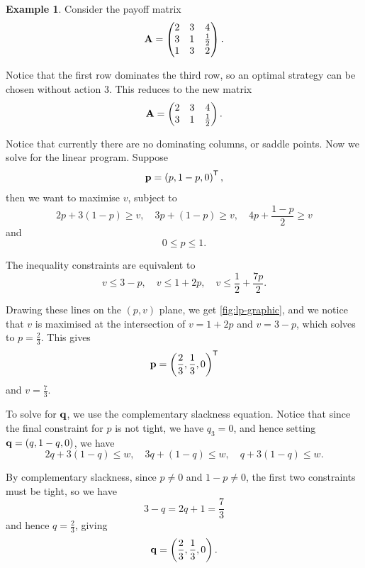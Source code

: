 \documentclass[11pt]{article}
\theoremstyle{definition}
\newtheorem{example}[theorem]{Example}
\theoremstyle{remark}
\newcommand{\pqty}[1]{\left(#1\right)}
\newcommand{\flatfrac}[2]{\frac{#1}{#2}}
\newcommand{\pmqty}[1]{\begin{pmatrix}#1\end{pmatrix}}
\newcommand{\transpose}{^{\mathsf{T}}}
\begin{document}
\begin{example}\label{optim-unit-0064}
    Consider the payoff matrix
    \[
        \vb{A} = \pmqty{
            2 & 3 & 4 \\
            3 & 1 & \flatfrac{1}{2} \\
            1 & 3 & 2
        }.
    \]

    Notice that the first row dominates the third row, so an optimal strategy can be chosen without action 3. This reduces to the new matrix
    \[
        \vb{A} = \pmqty{
            2 & 3 & 4 \\
            3 & 1 & \flatfrac{1}{2}
        }.
    \]

    Notice that currently there are no dominating columns, or saddle points. Now we solve for the linear program. Suppose
    \[
        \vb{p} = \pqty{p, 1 - p, 0}\transpose,
    \]
    then we want to maximise \(v\), subject to
    \[
        2p + 3 \pqty{1 - p} \geq v, \quad 3p + \pqty{1 - p} \geq v, \quad 4p + \frac{1 - p}{2} \geq v
    \]
    and
    \[
        0 \leq p \leq 1.
    \]

    The inequality constraints are equivalent to
    \[
        v \leq 3 - p, \quad v \leq 1 + 2p, \quad v \leq \flatfrac{1}{2} + \flatfrac{7p}{2}.
    \]

    Drawing these lines on the \(\pqty{p, v}\) plane, we get \autoref{fig:lp-graphic}, and we notice that \(v\) is maximised at the intersection of \(v = 1 + 2p\) and \(v = 3 - p\), which solves to \(p = \flatfrac{2}{3}\). This gives
    \[
        \vb{p} = \pqty{\flatfrac{2}{3}, \flatfrac{1}{3}, 0}\transpose
    \]
    and \(v = \flatfrac{7}{3}\).
    
    To solve for \(\vb{q}\), we use the complementary slackness equation. Notice that since the final constraint for \(p\) is not tight, we have \(q_3 = 0\), and hence setting \(\vb{q} = \pqty{q, 1 - q, 0}\), we have
    \[
        2q + 3 \pqty{1 - q} \leq w, \quad 3q + \pqty{1 - q} \leq w, \quad q + 3 \pqty{1 - q} \leq w.
    \]

    By complementary slackness, since \(p \neq 0\) and \(1 - p \neq 0\), the first two constraints must be tight, so we have
    \[
        3 - q = 2q + 1 = \frac{7}{3}
    \]
    and hence \(q = \flatfrac{2}{3}\), giving
    \[
        \vb{q} = \pqty{\flatfrac{2}{3}, \flatfrac{1}{3}, 0}.
    \]
\end{example}
\end{document}
